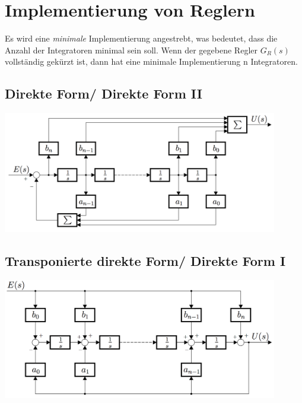 \section{Implementierung von Reglern }
Es wird eine \textit{minimale} Implementierung angestrebt, was bedeutet, dass die Anzahl
der Integratoren minimal sein soll. Wenn der gegebene Regler $G_R(s)$ vollständig
gekürzt ist, dann hat eine minimale Implementierung n Integratoren.


\subsection{Direkte Form/ Direkte Form II}
\begin{center}
        \includegraphics[width = 12cm]{./images/DirekteForm2}
\end{center}


\subsection{Transponierte direkte Form/ Direkte Form I}
\begin{center}
    \includegraphics[width = 12cm]{./images/DirekteForm1}
\end{center}